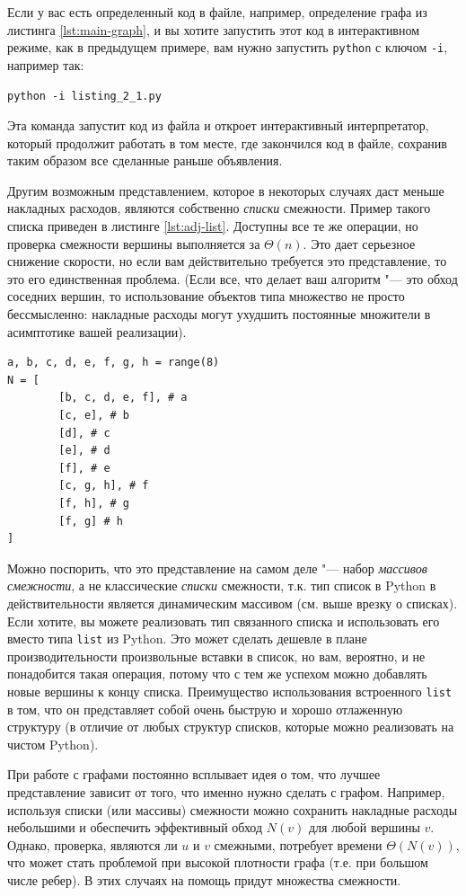 \begin{note}[Совет:]
Если у вас есть определенный код в файле, например, определение графа из листинга \ref{lst:main-graph}, и вы хотите запустить этот код в интерактивном режиме, как в предыдущем примере, вам нужно запустить \texttt{python} с ключом \texttt{-i}, например так:

\texttt{python -i listing\_2\_1.py}

Эта команда запустит код из файла и откроет интерактивный интерпретатор, который продолжит работать в том месте, где закончился код в файле, сохранив таким образом все сделанные раньше объявления.
\end{note}

Другим возможным представлением, которое в некоторых случаях даст меньше накладных расходов, являются собственно \textit{списки} смежности. Пример такого списка приведен в листинге \ref{lst:adj-list}. Доступны все те же операции, но проверка смежности вершины выполняется за $\Theta(n)$. Это дает серьезное снижение скорости, но если вам действительно требуется это представление, то это его единственная проблема. (Если все, что делает ваш алгоритм "--- это обход соседних вершин, то использование объектов типа множество не просто бессмысленно: накладные расходы могут ухудшить постоянные множители в асимптотике вашей реализации).

\begin{lstlisting}[caption={Списки смежности}, label={lst:adj-list}]
a, b, c, d, e, f, g, h = range(8)
N = [
		[b, c, d, e, f], # a
		[c, e], # b
		[d], # c
		[e], # d
		[f], # e
		[c, g, h], # f
		[f, h], # g
		[f, g] # h
]
\end{lstlisting}

Можно поспорить, что это представление на самом деле "--- набор \textit{массивов смежности}, а не классические \textit{списки} смежности, т.к. тип список в Python в действительности является динамическим массивом (см. выше врезку о списках). Если хотите, вы можете реализовать тип связанного списка и использовать его вместо типа \texttt{list} из Python. Это может сделать дешевле в плане производительности произвольные вставки в список, но вам, вероятно, и не понадобится такая операция, потому что с тем же успехом можно добавлять новые вершины к концу списка. Преимущество использования встроенного \texttt{list} в том, что он представляет собой очень быструю и хорошо отлаженную структуру (в отличие от любых структур списков, которые можно реализовать на чистом Python).

При работе с графами постоянно всплывает идея о том, что лучшее представление зависит от того, что именно нужно сделать с графом. Например, используя списки (или массивы) смежности можно сохранить накладные расходы небольшими и обеспечить эффективный обход $N(v)$ для любой вершины $v$. Однако, проверка, являются ли $u$ и $v$ смежными, потребует времени $\Theta(N(v))$, что может стать проблемой при высокой плотности графа (т.е. при большом числе ребер). В этих случаях на помощь придут множества смежности. 

